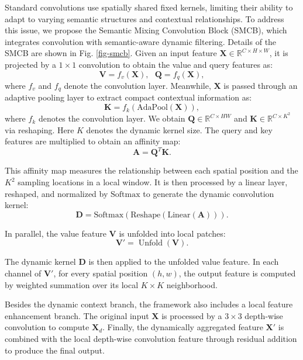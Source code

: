 Standard convolutions use spatially shared fixed kernels, limiting their ability to adapt to varying semantic structures and contextual relationships. To address this issue, we propose the Semantic Mixing Convolution Block (SMCB), which integrates convolution with semantic-aware dynamic filtering. Details of the SMCB are shown in Fig. \ref{fig-smcb}. Given an input feature $\mathbf{X}\in\mathbb{R}^{C\times H\times W}$, it is projected by a $1\times1$ convolution to obtain the value and query features as: 
\begin{equation}
\mathbf{V}=f_v(\mathbf{X}), ~~~ \mathbf{Q}=f_q(\mathbf{X}),
\end{equation}
where $f_v$ and $f_q$ denote the convolution layer. Meanwhile, $\mathbf{X}$ is passed through an adaptive pooling layer to extract compact contextual information as:
\begin{equation}
  \mathbf{K} = f_k(\mathrm{AdaPool}(\mathbf{X})),
\end{equation}
where $f_k$ denotes the convolution layer. We obtain $\mathbf{Q}\in\mathbb{R}^{C\times HW}$ and $\mathbf{K}\in\mathbb{R}^{C\times K^2}$ via reshaping. Here $K$ denotes the dynamic kernel size. The query and key features are multiplied to obtain an affinity map:
\begin{equation}
\mathbf{A}=\mathbf{Q}^{T}\mathbf{K}.
\end{equation}

This affinity map measures the relationship between each spatial position and the $K^2$ sampling locations in a local window. It is then processed by a linear layer, reshaped, and normalized by $\mathrm{Softmax}$ to generate the dynamic convolution kernel:
\begin{equation}
\mathbf{D}=\mathrm{Softmax}(\mathrm{Reshape}(\mathrm{Linear}(\mathbf{A}))).
\end{equation}

In parallel, the value feature $\mathbf{V}$ is unfolded into local patches:
\begin{equation}
\mathbf{V}'=\operatorname{Unfold}(\mathbf{V}).
\end{equation}

The dynamic kernel $\mathbf{D}$ is then applied to the unfolded value feature. In each channel of $\mathbf{V'}$, for every spatial position $(h,w)$, the output feature is computed by weighted summation over its local $K\times K$ neighborhood.

Besides the dynamic context branch, the framework also includes a local feature enhancement branch. The original input $\mathbf{X}$ is processed by a $3\times3$ depth-wise convolution to compute $\mathbf{X}_d$. Finally, the dynamically aggregated feature $\mathbf{X}'$ is combined with the local depth-wise convolution feature through residual addition to produce the final output.


